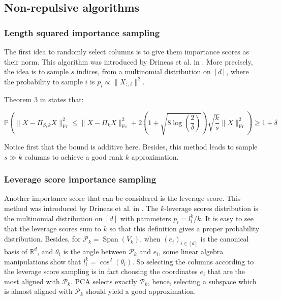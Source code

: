 \subsection{Non-repulsive algorithms}

\subsubsection{Length squared importance sampling}

The first idea to randomly select columns is to give them importance scores as their norm. This algorithm was introduced by Drineas et al. in \cite{drineas_clustering_2004}. More precisely, the idea is to sample $s$ indices, from a multinomial distribution on $[d]$, where the probability to sample $i$ is  $p_i \propto \lVert X_{:,i} \rVert^2$.

Theorem 3 in \cite{drineas_clustering_2004} states that:

 \[ \mathbb{P}( \lVert X - \Pi_{S,k}X  \rVert_{\operatorname{Fr}}^2 \leq \lVert X - \Pi_{k}X  \rVert_{\operatorname{Fr}}^2 + 2(1 + \sqrt{8 \log(\dfrac{2}{\delta} )}) \sqrt{\dfrac{k}{s}} \lVert X \rVert_{\operatorname{Fr}}^2) \geq 1 + \delta   \]

Notice first that the bound is additive here. Besides, this method leads to sample $s \gg k$ columns to achieve a good rank $k$ approximation.


\subsubsection{Leverage score importance sampling}

Another importance score that can be considered is the leverage score. This method was introduced by Drineas et al. in \cite{drineas_relative-error_2008}. The $k$-leverage scores distribution is the multinomial distribution on $[d]$ with parameters $p_i = l_i^k/k$. 
It is easy to see that the leverage scores sum to $k$ so that this definition gives a proper probability distribution.
Besides, for $\mathcal{P}_k = \operatorname{Span}(V_k)$, when $(e_i)_{i \in [d]}$ is the canonical basis of $\mathbb{R}^d$, and $\theta_i$ is the angle between $\mathcal{P}_k$ and $e_i$, some linear algebra manipulations show that $l_i^k = \cos^2(\theta_i) $.
So selecting the columns according to the leverage score sampling is in fact choosing the coordinates $e_i$ that are the most aligned with $\mathcal{P}_k$. PCA selects exactly $\mathcal{P}_k$,  hence, selecting a subspace which is almost aligned with $\mathcal{P}_k$ should yield a good approximation. 

